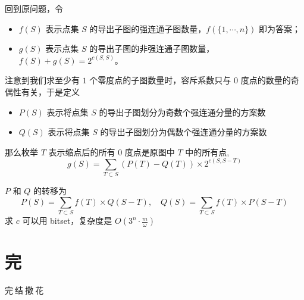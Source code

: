 \documentclass[UTF8]{beamer}
\begin{document}
    \begin{frame}
        回到原问题，令
        \begin{itemize}
            \item $f(S)$ 表示点集 $S$ 的导出子图的强连通子图数量，$f(\{1,\cdots,n\})$ 即为答案；
            \item $g(S)$ 表示点集 $S$ 的导出子图的非强连通子图数量，$f(S)+g(S) = 2^{c(S,S)}$。
        \end{itemize}

        注意到我们求至少有 $1$ 个零度点的子图数量时，容斥系数只与 $0$ 度点的数量的奇偶性有关，于是定义
        \begin{itemize}
            \item $P(S)$ 表示将点集 $S$ 的导出子图划分为奇数个强连通分量的方案数
            \item $Q(S)$ 表示将点集 $S$ 的导出子图划分为偶数个强连通分量的方案数
        \end{itemize}
        \pause
        那么枚举 $T$ 表示缩点后的所有 $0$ 度点是原图中 $T$ 中的所有点,
        $$
        g(S)=\sum_{T\subset S}(P(T)-Q(T))\times 2^{c(S,S-T)}
        $$

        \vspace{-1em}
        $P$ 和 $Q$ 的转移为
        $$
        P(S)=\sum_{T\subset S}f(T)\times Q(S-T),\quad Q(S)=\sum_{T\subset S}f(T)\times P(S-T)
        $$
        求 $c$ 可以用 bitset，复杂度是 $O(3^n\cdot \frac{m}{\omega})$
    \end{frame}

    \section{完}
	\begin{frame}
		\begin{center}
			\begin{Huge}
				完$\ $结$\ $撒$\ $花\\
			\end{Huge}
		\end{center}
	\end{frame}
\end{document}
